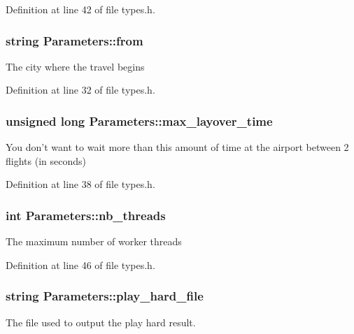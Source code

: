 Definition at line 42 of file types.\-h.

\hypertarget{struct_parameters_a0d67e8c0ef1b8c7edcf58fcd4946a16d}{
\subsubsection[{from}]{\setlength{\rightskip}{0pt plus 5cm}string Parameters\-::from}}\label{struct_parameters_a0d67e8c0ef1b8c7edcf58fcd4946a16d}
The city where the travel begins 

Definition at line 32 of file types.\-h.

\hypertarget{struct_parameters_a6280501b946429cdd733d81596cd65ae}{
\subsubsection[{max\-\_\-layover\-\_\-time}]{\setlength{\rightskip}{0pt plus 5cm}unsigned long Parameters\-::max\-\_\-layover\-\_\-time}}\label{struct_parameters_a6280501b946429cdd733d81596cd65ae}
You don't want to wait more than this amount of time at the airport between 2 flights (in seconds) 

Definition at line 38 of file types.\-h.

\hypertarget{struct_parameters_a930705020fe78a5e1a071aba1b85402d}{
\subsubsection[{nb\-\_\-threads}]{\setlength{\rightskip}{0pt plus 5cm}int Parameters\-::nb\-\_\-threads}}\label{struct_parameters_a930705020fe78a5e1a071aba1b85402d}
The maximum number of worker threads 

Definition at line 46 of file types.\-h.

\hypertarget{struct_parameters_aeeca8945df96e268a29d00b284f00815}{
\subsubsection[{play\-\_\-hard\-\_\-file}]{\setlength{\rightskip}{0pt plus 5cm}string Parameters\-::play\-\_\-hard\-\_\-file}}\label{struct_parameters_aeeca8945df96e268a29d00b284f00815}
The file used to output the play hard result. 

